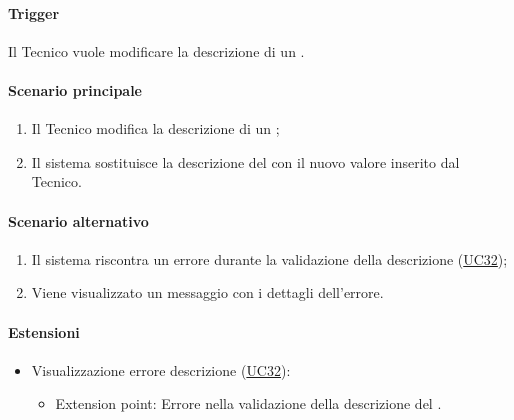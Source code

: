 \paragraph*{Trigger}
Il Tecnico vuole modificare la descrizione di un .

\paragraph*{Scenario principale}
\begin{enumerate}
  \item Il Tecnico modifica la descrizione di un ;
  \item Il sistema sostituisce la descrizione del  con il nuovo valore inserito dal Tecnico.
\end{enumerate}

\paragraph*{Scenario alternativo}
\begin{enumerate}
  \item Il sistema riscontra un errore durante la validazione della descrizione (\hyperref[UC32]{UC32});
  \item Viene visualizzato un messaggio con i dettagli dell'errore.
\end{enumerate}

\paragraph*{Estensioni}
\begin{itemize}
  \item Visualizzazione errore descrizione  (\hyperref[UC32]{UC32}):
  \begin{itemize}
    \item Extension point: Errore nella validazione della descrizione del .
  \end{itemize}
\end{itemize}